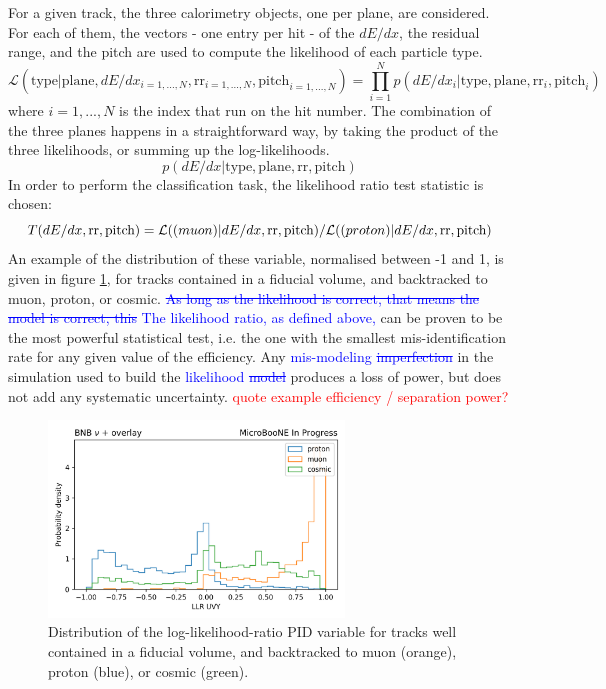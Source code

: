 \documentclass[a4paper]{article}
\begin{document}
For a given track, the three calorimetry objects, one per plane, are considered.
For each of them, the vectors - one entry per hit - of the $dE/dx$, the residual range, and the pitch are used to compute the likelihood of each particle type.
\[ \mathcal{L}(\text{type} | \text{plane}, dE/dx_{i = 1, ..., N},   \text{rr}_{i = 1, ..., N}, \text{pitch}_{i = 1, ..., N}) = \prod_{i=1}^N p(dE/dx_i | \text{type}, \text{plane}, \text{rr}_i, \text{pitch}_i) \]
where $i=1, ..., N$ is the index that run on the hit number.
The combination of the three planes happens in a straightforward way, by taking the product of the three likelihoods, or summing up the log-likelihoods.
\[ p(dE/dx | \text{type}, \text{plane}, \text{rr}, \text{pitch}) \]
In order to perform the classification task, the likelihood ratio test statistic is chosen:
\[ T(dE/dx, \text{rr}, \text{pitch}) = \mathcal{L}(\text(muon)| dE/dx, \text{rr}, \text{pitch}) /  \mathcal{L}(\text(proton)| dE/dx, \text{rr}, \text{pitch}) \]
An example of the distribution of these variable, normalised between -1 and 1, is given in figure \ref{fig:llr_pid_uvy_example}, for tracks contained in a fiducial volume, and backtracked to muon, proton, or cosmic. \textcolor{blue}{\st{As long as the likelihood is correct, that means the model is correct, this} The likelihood ratio, as defined above, } can be proven to be the most powerful statistical test, i.e. the one with the smallest mis-identification rate for any given value of the efficiency.
Any \textcolor{blue}{mis-modeling \st{imperfection}} in the simulation used to build the \textcolor{blue}{likelihood \st{model}} produces a loss of power, but does not add any systematic uncertainty.
\textcolor{red}{quote example efficiency / separation power?}

\begin{figure}[ht] 
    \centering
    \includegraphics[width=0.7\textwidth]{llrpid/llr_012_n.png}
    \caption{Distribution of the log-likelihood-ratio PID variable for tracks well contained in a fiducial volume, and backtracked to muon (orange), proton (blue), or cosmic (green).}
    \label{fig:llr_pid_uvy_example}
\end{figure}
\end{document}
